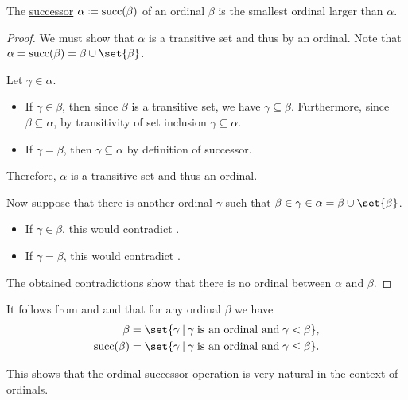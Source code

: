 \begin{proposition}\label{thm:successor_of_ordinal}
  The \hyperref[def:ordinal_successor]{successor} \( \alpha \coloneqq \operatorname{succ}(\beta) \) of an ordinal \( \beta \) is the smallest ordinal larger than \( \alpha \).
\end{proposition}
\begin{proof}
  We must show that \( \alpha \) is a transitive set and thus by  an ordinal. Note that \( \alpha = \op{succ}(\beta) = \beta \cup \set{ \beta } \).

  Let \( \gamma \in \alpha \).
  \begin{itemize}
    \item If \( \gamma \in \beta \), then since \( \beta \) is a transitive set, we have \( \gamma \subseteq \beta \). Furthermore, since \( \beta \subseteq \alpha \), by transitivity of set inclusion \( \gamma \subseteq \alpha \).

    \item If \( \gamma = \beta \), then \( \gamma \subseteq \alpha \) by definition of successor.
  \end{itemize}

  Therefore, \( \alpha \) is a transitive set and thus an ordinal.

  Now suppose that there is another ordinal \( \gamma \) such that \( \beta \in \gamma \in \alpha = \beta \cup \set{ \beta } \).
  \begin{itemize}
    \item If \( \gamma \in \beta \), this would contradict .

    \item If \( \gamma = \beta \), this would contradict .
  \end{itemize}

  The obtained contradictions show that there is no ordinal between \( \alpha \) and \( \beta \).
\end{proof}

\begin{remark}\label{rem:def:ordinal_successor}
  It follows from  and  and that for any ordinal \( \beta \) we have
  \begin{align*}
    \beta            &= \set{ \gamma \given \gamma \T{is an ordinal and} \gamma < \beta }, \\
    \op{succ}(\beta) &= \set{ \gamma \given \gamma \T{is an ordinal and} \gamma \leq \beta }.
  \end{align*}

  This shows that the \hyperref[def:ordinal_successor]{ordinal successor} operation is very natural in the context of ordinals.
\end{remark}

